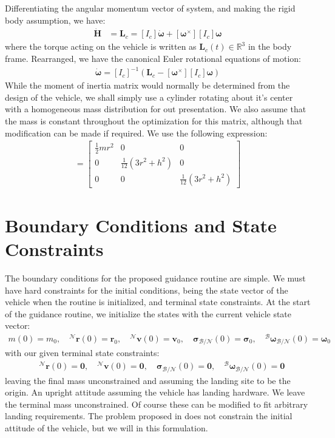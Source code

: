 Differentiating the angular momentum vector of system, and making the rigid body assumption, we have:
\begin{align}
\dot{\bm{H}} &= \mathbf{L}_c = [I_c]\dot{\boldsymbol{\omega}} + [\boldsymbol{\omega}^\times][I_c]\boldsymbol{\omega}
\end{align}
where the torque acting on the vehicle is written as $\mathbf{L}_c(t) \in \mathbb{R}^3$ in the body frame. Rearranged, we have the canonical Euler rotational equations of motion:
\begin{align}
	\dot{\boldsymbol{\omega}} = [I_c]^{-1}(\mathbf{L}_c - [\boldsymbol{\omega}^\times][I_c]\boldsymbol{\omega})
\end{align}
While the moment of inertia matrix would normally be determined from the design of the vehicle, we shall simply use a cylinder rotating about it's center with a homogeneous mass distribution for out presentation. We also assume that the mass is constant throughout the optimization for this matrix, although that modification can be made if required. We use the following expression:
\begin{align}
[I_c] = 
	\begin{bmatrix}
		\frac{1}{2} m r^{2} & 0 & 0 \\
		0 & \frac{1}{12}\left(3 r^{2}+h^{2}\right) & 0 \\
		0 & 0 & \frac{1}{12}\left(3 r^{2}+h^{2}\right)
	\end{bmatrix}
\end{align}




\section{Boundary Conditions and State Constraints}
The boundary conditions for the proposed guidance routine are simple. We must have hard constraints for the initial conditions, being the state vector of the vehicle when the routine is initialized, and terminal state constraints. At the start of the guidance routine, we initialize the states with the current vehicle state vector:
\begin{align}
	m(0) = m_0, \quad ^\mathcal{N}\mathbf{r}(0) = \mathbf{r}_0, \quad ^\mathcal{N}\mathbf{v}(0) = \mathbf{v}_0, \quad \boldsymbol{\sigma}_\mathcal{B/N}(0) = \boldsymbol{\sigma}_0, \quad  ^\mathcal{B}\boldsymbol{\omega}_\mathcal{B/N}(0) = \boldsymbol{\omega}_0
\end{align}
with our given terminal state constraints:
\begin{align}
	\quad ^\mathcal{N}\mathbf{r}(0) = \mathbf{0}, \quad ^\mathcal{N}\mathbf{v}(0) = \mathbf{0}, \quad \boldsymbol{\sigma}_\mathcal{B/N}(0) = \mathbf{0}, \quad  ^\mathcal{B}\boldsymbol{\omega}_\mathcal{B/N}(0) = \mathbf{0}
\end{align}
leaving the final mass unconstrained and assuming the landing site to be the origin. An upright attitude assuming the vehicle has landing hardware. We leave the terminal mass unconstrained. Of course these can be modified to fit arbitrary landing requirements. The problem proposed in \cite{szmuk2018successive} does not constrain the initial attitude of the vehicle, but we will in this formulation.

